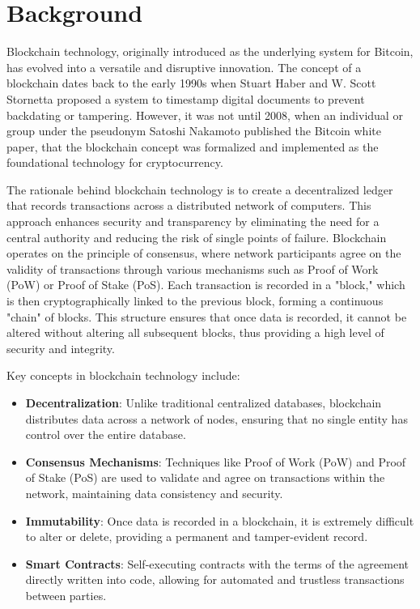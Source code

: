 \documentclass[main.tex]{subfiles}
\begin{document}
\section{Background}\label{sec:background}
Blockchain technology, originally introduced as the underlying system for Bitcoin, has evolved into a versatile and disruptive innovation. The concept of a blockchain dates back to the early 1990s when Stuart Haber and W. Scott Stornetta proposed a system to timestamp digital documents to prevent backdating or tampering. However, it was not until 2008, when an individual or group under the pseudonym Satoshi Nakamoto published the Bitcoin white paper, that the blockchain concept was formalized and implemented as the foundational technology for cryptocurrency.

The rationale behind blockchain technology is to create a decentralized ledger that records transactions across a distributed network of computers. This approach enhances security and transparency by eliminating the need for a central authority and reducing the risk of single points of failure. Blockchain operates on the principle of consensus, where network participants agree on the validity of transactions through various mechanisms such as Proof of Work (PoW) or Proof of Stake (PoS). Each transaction is recorded in a "block," which is then cryptographically linked to the previous block, forming a continuous "chain" of blocks. This structure ensures that once data is recorded, it cannot be altered without altering all subsequent blocks, thus providing a high level of security and integrity.

Key concepts in blockchain technology include:

\begin{itemize}
    \item \textbf{Decentralization}: Unlike traditional centralized databases, blockchain distributes data across a network of nodes, ensuring that no single entity has control over the entire database.
    \item \textbf{Consensus Mechanisms}: Techniques like Proof of Work (PoW) and Proof of Stake (PoS) are used to validate and agree on transactions within the network, maintaining data consistency and security.
    \item \textbf{Immutability}: Once data is recorded in a blockchain, it is extremely difficult to alter or delete, providing a permanent and tamper-evident record.
    \item \textbf{Smart Contracts}: Self-executing contracts with the terms of the agreement directly written into code, allowing for automated and trustless transactions between parties.
\end{itemize}
\end{document}
